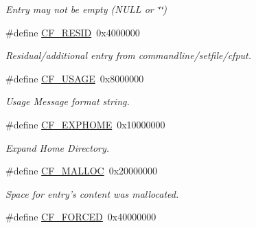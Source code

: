 \begin{DoxyCompactItemize}
\begin{DoxyCompactList}\small\item\em Entry may not be empty ({\ttfamily N\-U\-L\-L} or \char`\"{}\char`\"{}) \end{DoxyCompactList}\item 
\hypertarget{group__special__options__mask_ga5415b257c706aae33d91d3947a3429c0}{\#define \hyperlink{group__special__options__mask_ga5415b257c706aae33d91d3947a3429c0}{C\-F\-\_\-\-R\-E\-S\-I\-D}~0x4000000}\label{group__special__options__mask_ga5415b257c706aae33d91d3947a3429c0}

\begin{DoxyCompactList}\small\item\em Residual/additional entry from commandline/setfile/cfput. \end{DoxyCompactList}\item 
\hypertarget{group__special__options__mask_gac30981201d7455071cef38a0133b9228}{\#define \hyperlink{group__special__options__mask_gac30981201d7455071cef38a0133b9228}{C\-F\-\_\-\-U\-S\-A\-G\-E}~0x8000000}\label{group__special__options__mask_gac30981201d7455071cef38a0133b9228}

\begin{DoxyCompactList}\small\item\em Usage Message format string. \end{DoxyCompactList}\item 
\hypertarget{group__special__options__mask_gaff1b2e25aa9a89a55c1784018e24aa75}{\#define \hyperlink{group__special__options__mask_gaff1b2e25aa9a89a55c1784018e24aa75}{C\-F\-\_\-\-E\-X\-P\-H\-O\-M\-E}~0x10000000}\label{group__special__options__mask_gaff1b2e25aa9a89a55c1784018e24aa75}

\begin{DoxyCompactList}\small\item\em Expand Home Directory. \end{DoxyCompactList}\item 
\hypertarget{group__special__options__mask_ga2b971231bd3cbad743ef2f4e0a613a47}{\#define \hyperlink{group__special__options__mask_ga2b971231bd3cbad743ef2f4e0a613a47}{C\-F\-\_\-\-M\-A\-L\-L\-O\-C}~0x20000000}\label{group__special__options__mask_ga2b971231bd3cbad743ef2f4e0a613a47}

\begin{DoxyCompactList}\small\item\em Space for entry's content was mallocated. \end{DoxyCompactList}\item 
\hypertarget{group__special__options__mask_ga618e7187ee15bacfe668e72a858e71fc}{\#define \hyperlink{group__special__options__mask_ga618e7187ee15bacfe668e72a858e71fc}{C\-F\-\_\-\-F\-O\-R\-C\-E\-D}~0x40000000}\label{group__special__options__mask_ga618e7187ee15bacfe668e72a858e71fc}


\end{DoxyCompactItemize}
